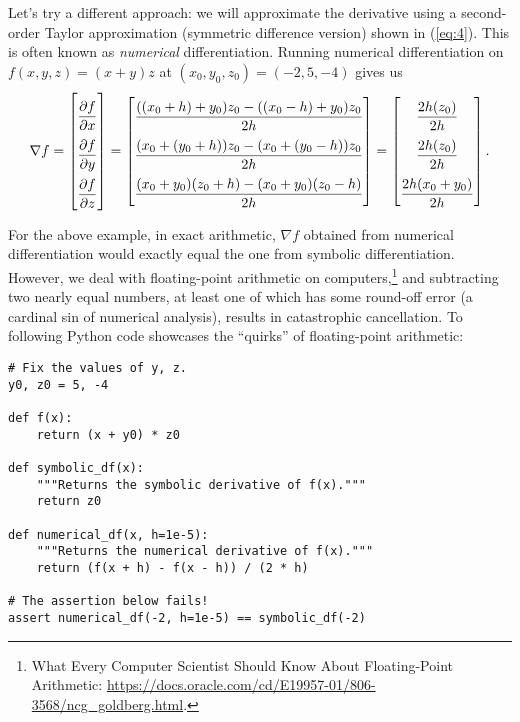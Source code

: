 Let's try a different approach: we will approximate the derivative using a second-order Taylor approximation (symmetric difference version) shown in (\ref{eq:4}). This is often known as \textit{numerical} differentiation. Running numerical differentiation on $f(x, y, z) = (x + y) z$ at $(x_0, y_0, z_0) = (-2, 5, -4)$ gives us
$$
    \renewcommand{\arraystretch}{2.3}
    \nabla f = \begin{bmatrix}
    \dfrac{\partial f}{\partial x} \\
    \dfrac{\partial f}{\partial y} \\
    \dfrac{\partial f}{\partial z}
    \end{bmatrix} 
    = \begin{bmatrix}
    \dfrac{((x_0 + h) + y_0) z_0 - ((x_0 - h) + y_0) z_0}{2h} \\
    \dfrac{(x_0 + (y_0 + h)) z_0 - (x_0 + (y_0 - h)) z_0}{2h} \\
    \dfrac{(x_0 + y_0)(z_0 + h) - (x_0 + y_0)(z_0 - h)}{2h}
    \end{bmatrix} 
    = \begin{bmatrix}
    \dfrac{2h (z_0)}{2h} \\
    \dfrac{2h (z_0)}{2h} \\
    \dfrac{2h (x_0 + y_0)}{2h}
    \end{bmatrix}.
    \renewcommand{\arraystretch}{1.5}
$$

For the above example, in exact arithmetic, $\nabla f$ obtained from numerical differentiation would exactly equal the one from symbolic differentiation. However, we deal with floating-point arithmetic on computers,\footnote{What Every Computer Scientist Should Know About Floating-Point Arithmetic: \url{https://docs.oracle.com/cd/E19957-01/806-3568/ncg_goldberg.html}.} and subtracting two nearly equal numbers, at least one of which has some round-off error (a cardinal sin of numerical analysis), results in catastrophic cancellation. To following Python code showcases the ``quirks'' of floating-point arithmetic:
\begin{lstlisting}
# Fix the values of y, z.
y0, z0 = 5, -4

def f(x): 
    return (x + y0) * z0

def symbolic_df(x):
    """Returns the symbolic derivative of f(x)."""
    return z0

def numerical_df(x, h=1e-5):
    """Returns the numerical derivative of f(x)."""
    return (f(x + h) - f(x - h)) / (2 * h)

# The assertion below fails!
assert numerical_df(-2, h=1e-5) == symbolic_df(-2)
\end{lstlisting}

